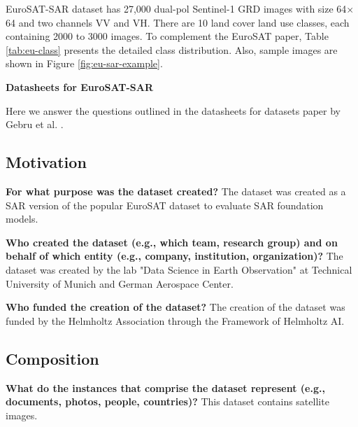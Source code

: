 \documentclass[lettersize,journal]{IEEEtran}
\begin{document}
EuroSAT-SAR dataset has 27,000 dual-pol Sentinel-1 GRD images with size 64$\times$64 and two channels VV and VH. There are 10 land cover land use classes, each containing 2000 to 3000 images. To complement the EuroSAT paper, Table \ref{tab:eu-class} presents the detailed class distribution. Also, sample images are shown in Figure \ref{fig:eu-sar-example}.











\clearpage
\newpage

\begin{figure*}
    \centering
\begin{minipage}{\textwidth}
\centering
\large\textbf{Datasheets for EuroSAT-SAR}
\end{minipage}
\end{figure*}

\setcounter{subsection}{0}
Here we answer the questions outlined in the datasheets for datasets paper by Gebru et al. \cite{gebru2021datasheets}.

\vspace{-3em}
\subsection{Motivation}
\vspace{-0.5em}

\textbf{For what purpose was the dataset created?} The dataset was created as a SAR version of the popular EuroSAT dataset to evaluate SAR foundation models.

\textbf{Who created the dataset (e.g., which team, research group) and on behalf of which entity (e.g.,
company, institution, organization)?} The dataset was created by the lab "Data Science in Earth Observation" at Technical University of Munich and German Aerospace Center.

\textbf{Who funded the creation of the dataset?} The creation of the dataset was funded by the Helmholtz Association through the Framework of Helmholtz AI.

\vspace{-2.5em}
\subsection{Composition}
\vspace{-0.5em}

\textbf{What do the instances that comprise the dataset represent (e.g., documents, photos, people, countries)?} This dataset contains satellite images.
\end{document}
